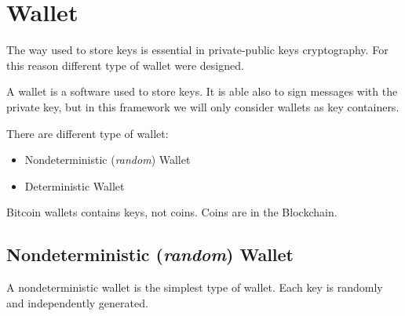 
\chapter{Wallet} %

\label{wallet} %




The way used to store keys is essential in private-public keys cryptography. For this reason different type of wallet were designed.
\begin{definition}
	A wallet is a software used to store keys. It is able also to sign messages with the private key, but in this framework we will only consider wallets as key containers. 
\end{definition}
There are different type of wallet:
\begin{itemize}
	\item Nondeterministic (\textit{random}) Wallet
	\item Deterministic Wallet
\end{itemize}

\begin{remark}
	Bitcoin wallets contains keys, not coins. Coins are in the Blockchain.
\end{remark}

\section{Nondeterministic (\textit{random}) Wallet}
A nondeterministic wallet is the simplest type of wallet. Each key is randomly and independently generated.

